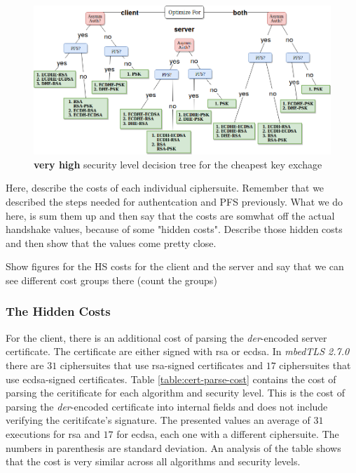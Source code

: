\documentclass{llncs}
\begin{document}
\begin{figure}
  \centering
  \includegraphics[width=1.0\textwidth]{img/dt_veryhigh_sl.png}
  \centering \caption{\label{fig:dt-veryhigh-sl} \textbf{very high} security level decision tree for the cheapest key exchage}
\end{figure}
 

Here, describe the costs of each individual ciphersuite. Remember that we described the steps needed for authentcation and PFS previously.
What we do here, is sum them up and then say that the costs are somwhat off the actual handshake values, because of some "hidden costs".
Describe those hidden costs and then show that the values come pretty close.

Show figures for the HS costs for the client and the server and say that we can see different cost groups there (count the groups)

\subsubsection{The Hidden Costs}


For the client, there is an additional cost of parsing the \textit{der}-encoded server certificate. The certificate are either signed with
\gls{rsa} or \gls{ecdsa}. In \textit{mbedTLS 2.7.0} there are $31$ ciphersuites that use \gls{rsa}-signed certificates and $17$ ciphersuites
that use \gls{ecdsa}-signed certificates. Table \ref{table:cert-parse-cost} contains the cost of parsing the ceritificate for each algorithm
and security level. This is the cost of parsing the \textit{der}-encoded certificate into internal fields and does not include verifying 
the ceritifcate's signature. The presented values an average of $31$ executions for \gls{rsa} and $17$ for \gls{ecdsa}, each one with a 
different ciphersuite. The numbers in parenthesis are standard deviation. An analysis of the table shows that the cost is very similar across all
algorithms and security levels.
\end{document}
